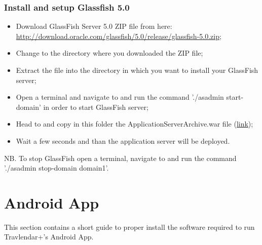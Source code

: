 \subsubsection{Install and setup Glassfish 5.0}
\begin{itemize}
	\item Download GlassFish Server 5.0 ZIP file from here: \\ \href{http://download.oracle.com/glassfish/5.0/release/glassfish-5.0.zip}{\color{blue}http://download.oracle.com/glassfish/5.0/release/glassfish-5.0.zip};
	\item Change to the directory where you downloaded the ZIP file;
	\item Extract the file into the directory in which you want to install your GlassFish server;
	\item Open a terminal and navigate to  and run the command './asadmin start-domain' in order to start GlassFish server;
	\item Head to  and copy in this folder the ApplicationServerArchive.war file (\href{https://github.com/JustSalva/MelziPinaSalvadore/tree/master/DeliveryFolder/InstallationFolder}{\color{blue}link});
	\item Wait a few seconds and than the application server will be deployed.
\end{itemize}
NB. To stop GlassFish open a terminal, navigate to  and run the command './asadmin stop-domain domain1'.

\section{Android App}
\label{sect:Android App}
This section contains a short guide to proper install the software required to run Travlendar+'s Android App.

